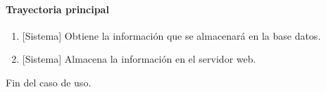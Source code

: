 \paragraph{Trayectoria principal}
	\begin{enumerate}
		\item {[Sistema]} Obtiene la información que se almacenará en la base datos.
		\item {[Sistema]} Almacena la información en el servidor web.
	\end{enumerate}
	Fin del caso de uso.
